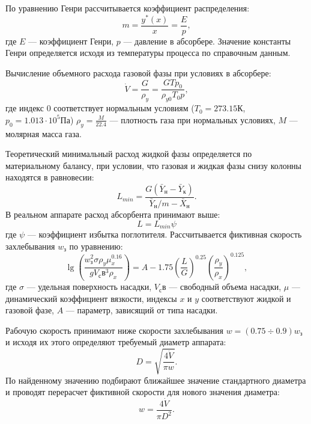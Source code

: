 По уравнению Генри рассчитывается коэффициент распределения:
\begin{equation}
	 m = \dfrac{y^*(x)}{x}=\dfrac{E}{p},
\end{equation} 
где $E$ --- коэффициент Генри, $p$ --- давление в абсорбере. Значение константы Генри определяется исходя из температуры процесса по справочным данным.

Вычисление объемного расхода газовой фазы при условиях в абсорбере:
\begin{equation}
	\dot{V} = \dfrac{G} {\rho_y} = \dfrac{G T  p_0}{\rho_{y0} T_0 p },
\end{equation}
где индекс $0$ соответствует нормальным условиям ($T_0=273.15 К$, $p_0 = 1.013 \cdot 10^5 Па$) $\rho_y=\frac{M}{22.4}$ --- плотность газа при нормальных условиях, $M$ --- молярная масса газа.

Теоретический минимальный расход жидкой фазы определяется по материальному балансу, при условии, что газовая и жидкая фазы снизу колонны находятся в равновесии:
\begin{equation}
	L_{min} = \dfrac{G (\bar{Y}_н - \bar{Y}_к) } {\bar{Y}_н /m - \bar{X}_н}.
\end{equation}
В реальном аппарате расход абсорбента принимают выше:
\begin{equation}
	L = L_{min} \psi
\end{equation}
где $\psi$ --- коэффициент избытка поглотителя.
Рассчитывается фиктивная скорость захлебывания $w_з$ по уравнению:
\begin{equation}
	\lg\left( \dfrac{w_з^2 \sigma \rho_y \mu_x^0.16} {g V_св^3 \rho_x} \right) = A -1.75 \left( \dfrac{L}{G} \right)^{0.25} \left( \dfrac{\rho_y}{\rho_x} \right)^{0.125},
\end{equation}
где $\sigma$ --- удельная поверхность насадки, $V_св$ --- свободный объема насадки, $\mu$ --- динамический коэффициент вязкости, индексы $x$ и $y$ соответствуют жидкой и газовой фазе, $A$ --- параметр, зависящий от типа насадки.

Рабочую скорость принимают ниже скорости захлебывания $w = (0.75 \div 0.9)w_з $ и исходя их этого определяют требуемый диаметр аппарата:
\begin{equation}
	D = \sqrt{\dfrac{4\dot{V}}{\pi w }}.
\end{equation}
По найденному значению подбирают ближайшее значение стандартного диаметра и проводят перерасчет фиктивной скорости для нового значения диаметра:
\begin{equation}
	w = \dfrac{4 \dot{V}}{\pi D^2}.
\end{equation}

